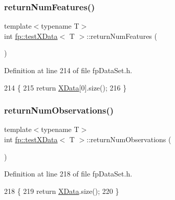 \subsubsection{\texorpdfstring{return\+Num\+Features()}{returnNumFeatures()}}
{\footnotesize\ttfamily template$<$typename T$>$ \\
int \hyperlink{classfp_1_1testXData}{fp\+::test\+X\+Data}$<$ T $>$\+::return\+Num\+Features (\begin{DoxyParamCaption}{ }\end{DoxyParamCaption})\hspace{0.3cm}{\ttfamily [inline]}}



Definition at line 214 of file fp\+Data\+Set.\+h.


\begin{DoxyCode}
214                                       \{
215             \textcolor{keywordflow}{return} \hyperlink{classfp_1_1testXData_a3a7fe96fa4c950d66be4e9e8faa70e9c}{XData}[0].size();
216         \}
\end{DoxyCode}
\mbox{\label{classfp_1_1testXData_a607ffec0652bccbd7bde861dd67afa81}} 
\subsubsection{\texorpdfstring{return\+Num\+Observations()}{returnNumObservations()}}
{\footnotesize\ttfamily template$<$typename T$>$ \\
int \hyperlink{classfp_1_1testXData}{fp\+::test\+X\+Data}$<$ T $>$\+::return\+Num\+Observations (\begin{DoxyParamCaption}{ }\end{DoxyParamCaption})\hspace{0.3cm}{\ttfamily [inline]}}



Definition at line 218 of file fp\+Data\+Set.\+h.


\begin{DoxyCode}
218                                           \{
219             \textcolor{keywordflow}{return} \hyperlink{classfp_1_1testXData_a3a7fe96fa4c950d66be4e9e8faa70e9c}{XData}.size();
220         \}
\end{DoxyCode}
\mbox{\label{classfp_1_1testXData_a3fc6beff70a4e516a248685681a8b2e1}} 
